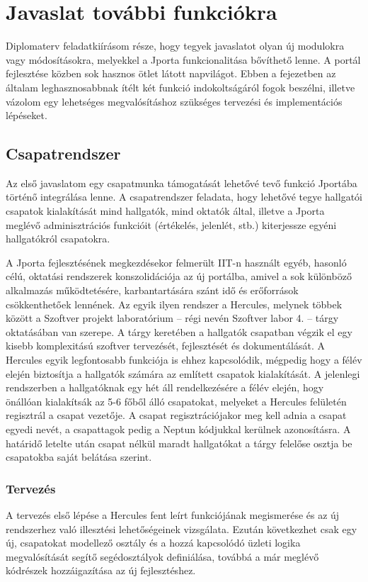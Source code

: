 \chapter{Javaslat további funkciókra}\label{chapter:features}
Diplomaterv feladatkiírásom része, hogy tegyek javaslatot olyan új modulokra vagy módosításokra, melyekkel a Jporta funkcionalitása bővíthető lenne.
A portál fejlesztése közben sok hasznos ötlet látott napvilágot.
Ebben a fejezetben az általam leghasznosabbnak ítélt két funkció indokoltságáról fogok beszélni, illetve vázolom egy lehetséges megvalósításhoz szükséges tervezési és implementációs lépéseket.

\section{Csapatrendszer}
Az első javaslatom egy csapatmunka támogatását lehetővé tevő funkció Jportába történő integrálása lenne.
A csapatrendszer feladata, hogy lehetővé tegye hallgatói csapatok kialakítását mind hallgatók, mind oktatók által, illetve a Jporta meglévő adminisztrációs funkcióit (értékelés, jelenlét, stb.) kiterjessze egyéni hallgatókról csapatokra.

A Jporta fejlesztésének megkezdésekor felmerült IIT-n használt egyéb, hasonló célú, oktatási rendszerek konszolidációja az új portálba, amivel a sok különböző alkalmazás működtetésére, karbantartására szánt idő és erőforrások csökkenthetőek lennének.
Az egyik ilyen rendszer a Hercules, melynek többek között a Szoftver projekt laboratórium -- régi nevén Szoftver labor 4. -- tárgy oktatásában van szerepe.
A tárgy keretében a hallgatók csapatban végzik el egy kisebb komplexitású szoftver tervezését, fejlesztését és dokumentálását.
A Hercules egyik legfontosabb funkciója is ehhez kapcsolódik, mégpedig hogy a félév elején biztosítja a hallgatók számára az említett csapatok kialakítását.
A jelenlegi rendszerben a hallgatóknak egy hét áll rendelkezésére a félév elején, hogy önállóan kialakítsák az 5-6 főből álló csapatokat, melyeket a Hercules felületén regisztrál a csapat vezetője.
A csapat regisztrációjakor meg kell adnia a csapat egyedi nevét, a csapattagok pedig a Neptun kódjukkal kerülnek azonosításra.
A határidő letelte után csapat nélkül maradt hallgatókat a tárgy felelőse osztja be csapatokba saját belátása szerint. 

\subsection{Tervezés}
A tervezés első lépése a Hercules fent leírt funkciójának megismerése és az új rendszerhez való illesztési lehetőségeinek vizsgálata.
Ezután következhet csak egy új, csapatokat modellező osztály és a hozzá kapcsolódó üzleti logika megvalósítását segítő segédosztályok definiálása, továbbá a már meglévő kódrészek hozzáigazítása az új fejlesztéshez.

